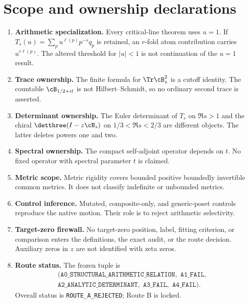 \section{Scope and ownership declarations}

\begin{enumerate}
  \item \textbf{Arithmetic specialization.}
  Every critical-line theorem uses $u=1$.  If
  $T_s(u)=\sum_pu^{\ell(p)}p^{-s}q_p$ is retained, an $r$-fold atom
  contribution carries $u^{r\ell(p)}$.  The altered threshold for
  $|u|<1$ is not continuation of the $u=1$ result.

  \item \textbf{Trace ownership.}
  The finite formula for $\Tr\cB_s^2$ is a cutoff identity.
  The countable $\cB_{1/2+it}$ is not Hilbert--Schmidt, so no ordinary
  second trace is asserted.

  \item \textbf{Determinant ownership.}
  The Euler determinant of $T_s$ on $\Re s>1$ and the chiral
  $\detthree(I-z\cB_s)$ on $1/3<\Re s<2/3$ are different objects.
  The latter deletes powers one and two.

  \item \textbf{Spectral ownership.}
  The compact self-adjoint operator depends on $t$.  No fixed operator
  with spectral parameter $t$ is claimed.

  \item \textbf{Metric scope.}
  Metric rigidity covers bounded positive boundedly invertible common
  metrics.  It does not classify indefinite or unbounded metrics.

  \item \textbf{Control inference.}
  Mutated, composite-only, and generic-poset controls reproduce the
  native motion.  Their role is to reject arithmetic selectivity.

  \item \textbf{Target-zero firewall.}
  No target-zero position, label, fitting criterion, or comparison
  enters the definitions, the exact audit, or the route decision.
  Auxiliary zeros in $z$ are not identified with zeta zeros.

  \item \textbf{Route status.}
  The frozen tuple is
  \[
  \begin{gathered}
  (\texttt{A0\_STRUCTURAL\_ARITHMETIC\_RELATION},
   \texttt{ A1\_FAIL},\\
   \texttt{A2\_ANALYTIC\_DETERMINANT},
   \texttt{ A3\_FAIL},\texttt{ A4\_FAIL}).
  \end{gathered}
  \]
  Overall status is \texttt{ROUTE\_A\_REJECTED}; Route B is locked.
\end{enumerate}
